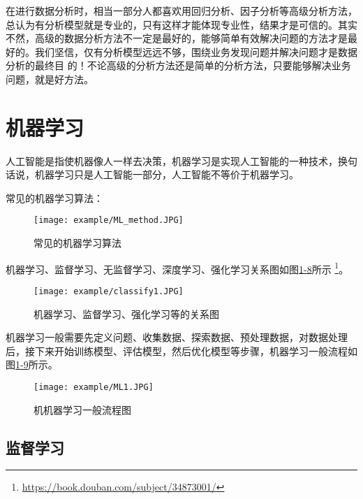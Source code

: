 在进行数据分析时，相当一部分人都喜欢用回归分析、因子分析等高级分析方法，总认为有分析模型就是专业的，只有这样才能体现专业性，结果才是可信的。其实不然，高级的数据分析方法不一定是最好的，能够简单有效解决问题的方法才是最好的。我们坚信，仅有分析模型远远不够，围绕业务发现问题并解决问题才是数据分析的最终目
的！不论高级的分析方法还是简单的分析方法，只要能够解决业务问题，就是好方法。

\section{机器学习}

人工智能是指使机器像人一样去决策，机器学习是实现人工智能的一种技术，换句话说，机器学习只是人工智能一部分，人工智能不等价于机器学习。

常见的机器学习算法：
\begin{figure}[!htp]

\centering
\texttt{[image: example/ML\_method.JPG]}
\caption{常见的机器学习算法}
\label{figure:1-7}

\end{figure}

机器学习、监督学习、无监督学习、深度学习、强化学习关系图如图\href{figure:1-8}{1-8}所示  \footnote{\url{https://book.douban.com/subject/34873001/}}。
\begin{figure}[!htp]

\centering
\texttt{[image: example/classify1.JPG]}
\caption{机器学习、监督学习、强化学习等的关系图}
\label{figure:1-8}
\end{figure}

机器学习一般需要先定义问题、收集数据、探索数据、预处理数据，对数据处理后，接下来开始训练模型、评估模型，然后优化模型等步骤，机器学习一般流程如图\href{figure:1-9}{1-9}所示。

\begin{figure}[!htp]
\centering
\texttt{[image: example/ML1.JPG]}
\caption{机机器学习一般流程图}
\label{figure:1-9}
\end{figure}


\subsection{监督学习}

